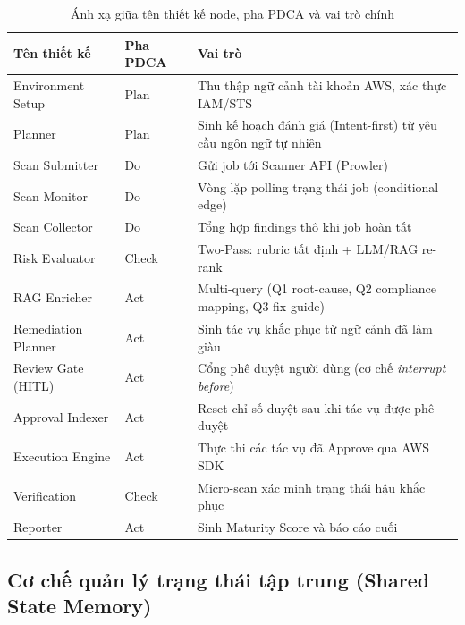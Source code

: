 \begin{table}[!htb]
  \centering
  \caption{Ánh xạ giữa tên thiết kế node, pha PDCA và vai trò chính}
  \label{tab:node_mapping}
  \renewcommand{\arraystretch}{1.15}
  \footnotesize
  \begin{tabular}{|p{4.0cm}|l|p{7.5cm}|}
    \hline
    \textbf{Tên thiết kế} & \textbf{Pha PDCA} & \textbf{Vai trò} \\
    \hline
    Environment Setup       & Plan  & Thu thập ngữ cảnh tài khoản AWS, xác thực IAM/STS \\ \hline
    Planner                 & Plan  & Sinh kế hoạch đánh giá (Intent-first) từ yêu cầu ngôn ngữ tự nhiên \\ \hline
    Scan Submitter          & Do    & Gửi job tới Scanner API (Prowler) \\ \hline
    Scan Monitor            & Do    & Vòng lặp polling trạng thái job (conditional edge) \\ \hline
    Scan Collector          & Do    & Tổng hợp findings thô khi job hoàn tất \\ \hline
    Risk Evaluator          & Check & Two-Pass: rubric tất định + LLM/RAG re-rank \\ \hline
    RAG Enricher            & Act   & Multi-query (Q1 root-cause, Q2 compliance mapping, Q3 fix-guide) \\ \hline
    Remediation Planner     & Act   & Sinh tác vụ khắc phục từ ngữ cảnh đã làm giàu \\ \hline
    Review Gate (HITL)      & Act   & Cổng phê duyệt người dùng (cơ chế \textit{interrupt before}) \\ \hline
    Approval Indexer        & Act   & Reset chỉ số duyệt sau khi tác vụ được phê duyệt \\ \hline
    Execution Engine        & Act   & Thực thi các tác vụ đã Approve qua AWS SDK \\ \hline
    Verification            & Check & Micro-scan xác minh trạng thái hậu khắc phục \\ \hline
    Reporter                & Act   & Sinh Maturity Score và báo cáo cuối \\ \hline
  \end{tabular}
\end{table}

\subsection{Cơ chế quản lý trạng thái tập trung (Shared State Memory)}

